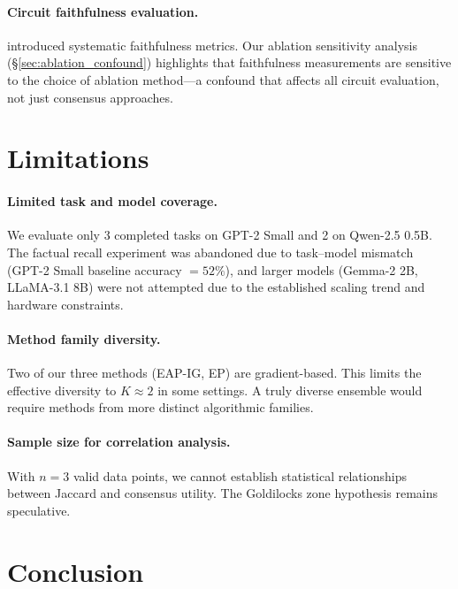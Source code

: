 \documentclass[11pt,a4paper]{article}
\newcommand{\eapig}{\textsc{EAP-IG}}
\newcommand{\ep}{\textsc{EP}}
\begin{document}
\paragraph{Circuit faithfulness evaluation.}
\citet{hanna2024does} introduced systematic faithfulness metrics.
Our ablation sensitivity analysis (\S\ref{sec:ablation_confound}) highlights that faithfulness measurements are sensitive to the choice of ablation method---a confound that affects all circuit evaluation, not just consensus approaches.

\section{Limitations}
\label{sec:limitations}

\paragraph{Limited task and model coverage.}
We evaluate only 3 completed tasks on GPT-2 Small and 2 on Qwen-2.5 0.5B.
The factual recall experiment was abandoned due to task--model mismatch (GPT-2 Small baseline accuracy $= 52\%$), and larger models (Gemma-2 2B, LLaMA-3.1 8B) were not attempted due to the established scaling trend and hardware constraints.

\paragraph{Method family diversity.}
Two of our three methods (\eapig{}, \ep{}) are gradient-based.
This limits the effective diversity to $K \approx 2$ in some settings.
A truly diverse ensemble would require methods from more distinct algorithmic families.

\paragraph{Sample size for correlation analysis.}
With $n = 3$ valid data points, we cannot establish statistical relationships between Jaccard and consensus utility.
The Goldilocks zone hypothesis remains speculative.

\section{Conclusion}
\label{sec:conclusion}
\end{document}
